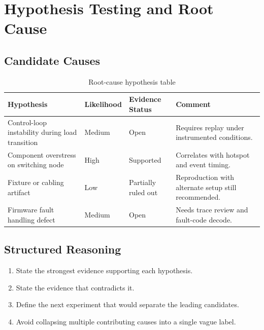 \section{Hypothesis Testing and Root Cause}

\subsection{Candidate Causes}
\begin{table}[H]
    \centering
    \small
    \begin{tabular}{p{3.3cm} p{2.1cm} p{2.2cm} p{3.9cm}}
        \toprule
        \textbf{Hypothesis} & \textbf{Likelihood} & \textbf{Evidence Status} & \textbf{Comment} \\
        \midrule
        Control-loop instability during load transition & Medium & Open & Requires replay under instrumented conditions. \\
        Component overstress on switching node & High & Supported & Correlates with hotspot and event timing. \\
        Fixture or cabling artifact & Low & Partially ruled out & Reproduction with alternate setup still recommended. \\
        Firmware fault handling defect & Medium & Open & Needs trace review and fault-code decode. \\
        \bottomrule
    \end{tabular}
    \caption{Root-cause hypothesis table}
    \label{tab:root-cause-hypotheses}
\end{table}

\subsection{Structured Reasoning}
\begin{enumerate}
    \item State the strongest evidence supporting each hypothesis.
    \item State the evidence that contradicts it.
    \item Define the next experiment that would separate the leading candidates.
    \item Avoid collapsing multiple contributing causes into a single vague label.
\end{enumerate}


